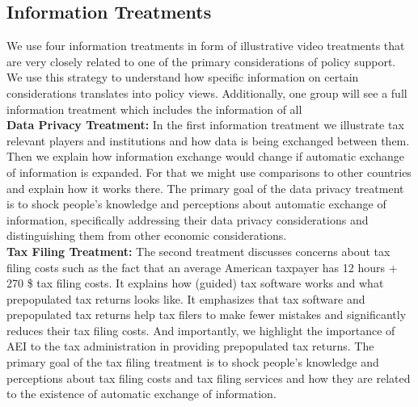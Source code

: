 \documentclass[11pt]{article}
\begin{document}
\subsection{Information Treatments}
We use four information treatments in form of illustrative video treatments that are very closely related to one of the primary considerations of policy support. We use this strategy to understand how specific information on certain considerations translates into policy views. Additionally, one group will see a full information treatment which includes the information of all  \\[0.5em]
\textbf{Data Privacy Treatment:}
In the first information treatment we illustrate tax relevant players and institutions and how data is being exchanged between them. Then we explain how information exchange would change if automatic exchange of information is expanded. For that we might use comparisons to other countries and explain how it works there. The primary goal of the data privacy treatment is to shock people’s knowledge and perceptions about automatic exchange of information, specifically addressing their data privacy considerations and distinguishing them from other economic considerations. \\[0.5em]%
\textbf{Tax Filing Treatment:}
The second treatment discusses concerns about tax filing costs such as the fact that an average American taxpayer has 12 hours + 270 \$ tax filing costs. It explains how (guided) tax software works and what prepopulated tax returns looks like. It emphasizes that tax software and prepopulated tax returns help tax filers to make fewer mistakes and significantly reduces their tax filing costs. And importantly, we highlight the importance of AEI to the tax administration in providing prepopulated tax returns. The primary goal of the tax filing treatment is to shock people's knowledge and perceptions about tax filing costs and tax filing services and how they are related to the existence of automatic exchange of information. \\[0.5em]%
\end{document}
